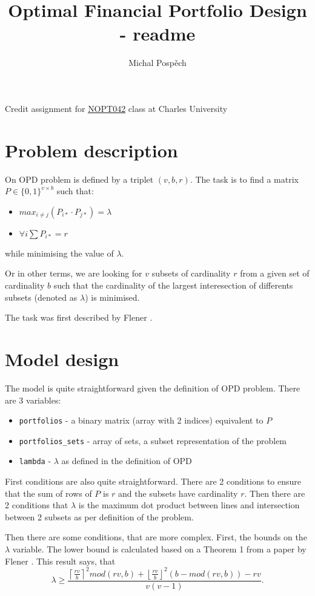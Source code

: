\documentclass{article}
\author{Michal Pospěch}
\title{Optimal Financial Portfolio Design - readme}
\begin{document}
\maketitle
Credit assignment for \href{https://ktiml.mff.cuni.cz/~bulin/csp/}{NOPT042} class at Charles University

\section{Problem description}

On OPD problem is defined by a triplet $(v,b,r)$. The task is to find a matrix $P\in \{0,1\}^{v\times b}$ such that: \begin{itemize}
    \item $max_{i\neq j}(P_{i*}\cdot P_{j*}) = \lambda$
    \item $\forall i \sum P_{i*} = r$
\end{itemize}

while minimising the value of $\lambda$.

Or in other terms, we are looking for $v$ subsets of cardinality $r$ from a given set of cardinality $b$ such that the cardinality of the largest interesection of differents subsets (denoted as $\lambda$) is minimised.

The task was first described by Flener \cite{OFPD}.

\section{Model design}
The model is quite straightforward given the definition of OPD problem. There are 3 variables:\begin{itemize}
    \item \texttt{portfolios} - a binary matrix (array with 2 indices) equivalent to $P$
    \item \texttt{portfolios\_sets} - array of sets, a subset representation of the problem
    \item \texttt{lambda} - $\lambda$ as defined in the definition of OPD
\end{itemize}


First conditions are also quite straightforward. There are 2 conditions to ensure that the sum of rows of $P$ is $r$ and the subsets have cardinality $r$. Then there are 2 conditions that $\lambda$ is the maximum dot product between lines and intersection between 2 subsets as per definition of the problem.

Then there are some conditions, that are more complex. First, the bounds on the $\lambda$ variable. The lower bound is calculated based on a Theorem 1 from a paper by Flener \cite{Design}. This result says, that
$$ \lambda \geq \frac{\left\lceil\frac{rv}{b} \right\rceil^2 mod(rv,b) + \left\lfloor\frac{rv}{b} \right\rfloor^2(b-mod(rv,b)) - rv}{v(v-1)}.$$
\end{document}
